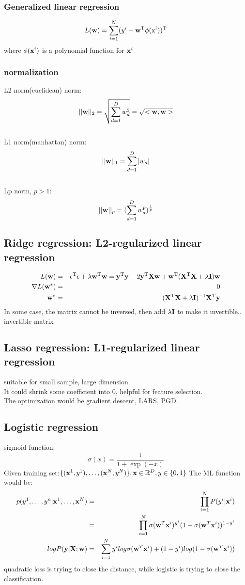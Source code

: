 \documentclass[12pt,a4paper]{article}
\begin{document}
\subsubsection*{Generalized linear regression}
$$
L({\bf w}) = \sum_{i=1}^{N}(y^i-{\bf w}^{\rm T}\phi({\rm x}^i))^{\rm T}
$$
where $\phi({\bf x}^i)$ is a polynomial function for ${\bf x}^i$
\subsubsection*{normalization}
L2 norm(euclidean) norm:
$$
||{\bf w}||_2 = \sqrt{\sum_{d=1}^{D}w_d^2}=\sqrt{<{\bf w},{\bf w}>}
$$\\
L1 norm(manhattan) norm:
$$
||{\bf w}||_1 = \sum_{d=1}^{D}|w_d|
$$\\
Lp norm, $p>1$:
$$
||{\bf w}||_p =(\sum_{d=1}^{D}w^p_d)^{\frac{1}{p}} 
$$
\subsection*{Ridge regression: L2-regularized linear regression}
\begin{eqnarray*}
L({\bf w}) &=& {\bf \epsilon}^{\rm T}{\bf \epsilon}+\lambda{\bf w}^{\rm T}{\bf w}={\bf y}^{\rm T}{\bf y}-2{\bf y}^{\rm T}{\bf X}{\bf w}+{\bf w}^{\rm T}({\bf X}^{\rm T}{\bf X}+\lambda{\bf I}){\bf w} \\
\nabla L({\bf w}^*) &=& 0 \\
{\bf w}^* &=& ({\bf X}^{\rm T}{\bf X}+\lambda{\bf I})^{-1}{\bf X}^{\rm T}{\bf y}
\end{eqnarray*}
In some case, the matrix cannot be inversed, then add $\lambda {\bf I}$ to make it invertible..\\
invertible matrix
\subsection*{Lasso regression: L1-regularized linear regression}
suitable for small sample, large dimension.\\
It could shrink some coefficient into 0, helpful for feature selection.\\
The optimization would be gradient descent, LARS, PGD.

\subsection*{Logistic regression}
sigmoid function:
$$
\sigma(x)=\frac{1}{1+\exp(-x)}
$$
Given training set:$\{({\bf x}^1,y^1),\ldots,({\bf x}^N,y^N)\},{\bf x} \in \mathbb{R}^D, y\in\{0,1\}$
The ML function would be:
\begin{eqnarray*}
p(y^1,\ldots,y^n|{\bf x}^1,\ldots,{\bf x}^N) &=& \prod_{i=1}^{N}P(y^i|{\bf x}^i)\\
&=& \prod_{i=1}^{N}\sigma({\bf w}^T{\bf x}^i)^{y^i}(1-\sigma({\bf w}^T{\bf x}^i))^{1-y^i}\\
logP({\bf y|X;w}) &=& \sum_{i=1}^{N}y^ilog\sigma({\bf w}^T{\bf x}^i)+(1-y^i)log(1-\sigma({\bf w}^T{\bf x}^i)) 
\end{eqnarray*}
quadratic loss is trying to close the distance, while logistic is trying to close the classification.
\end{document}
